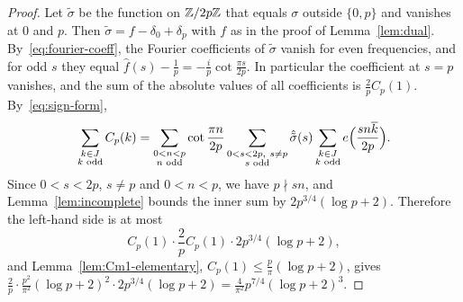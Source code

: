 \begin{proof}
Let $\tilde\sigma$ be the function on $\mathbb{Z}/2p\mathbb{Z}$ that equals $\sigma$ outside $\{0,p\}$ and vanishes at $0$ and $p$. Then $\tilde\sigma=f-\delta_0+\delta_p$ with $f$ as in the proof of Lemma~\ref{lem:dual}. By~\eqref{eq:fourier-coeff}, the Fourier coefficients of $\tilde\sigma$ vanish for even frequencies, and for odd $s$ they equal $\hat f(s)-\frac1p=-\frac ip\cot\frac{\pi s}{2p}$. In particular the coefficient at $s=p$ vanishes, and the sum of the absolute values of all coefficients is $\frac2pC_p(1)$. By~\eqref{eq:sign-form},
\[
\sum_{\substack{k\in J\\ k\text{ odd}}}C_p(k)=\sum_{\substack{0<n<p\\ n\text{ odd}}}\cot\frac{\pi n}{2p}
\sum_{\substack{0<s<2p,\ s\ne p\\ s\text{ odd}}}\hat{\tilde\sigma}(s)
\sum_{\substack{k\in J\\ k\text{ odd}}}e\Bigl(\frac{sn\overline{k}}{2p}\Bigr).
\]
Since $0<s<2p$, $s\ne p$ and $0<n<p$, we have $p\nmid sn$, and Lemma~\ref{lem:incomplete} bounds the inner sum by $2p^{3/4}(\log p+2)$. Therefore the left-hand side is at most
\[
C_p(1)\cdot\frac2pC_p(1)\cdot2p^{3/4}(\log p+2),
\]
and Lemma~\ref{lem:Cm1-elementary}, $C_p(1)\le\frac p\pi(\log p+2)$, gives $\frac{2}{p}\cdot\frac{p^2}{\pi^2}(\log p+2)^2\cdot2p^{3/4}(\log p+2)=\frac4{\pi^2}p^{7/4}(\log p+2)^3$.
\end{proof}

